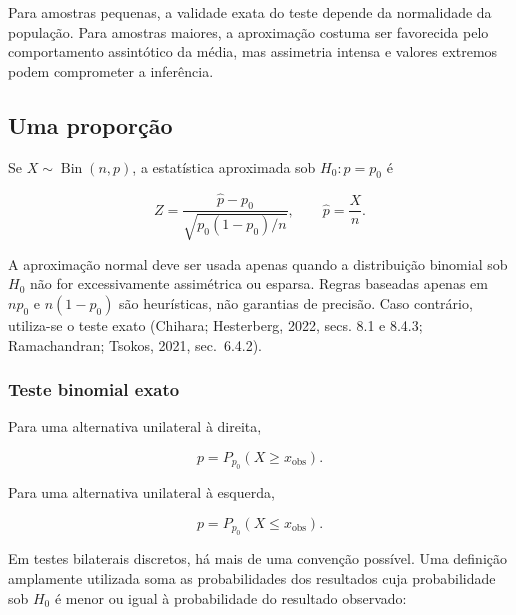 \documentclass[
  letterpaper,
  DIV=11,
  numbers=noendperiod]{scrreprt}
\begin{document}
\begin{tcolorbox}[enhanced jigsaw, colback=white, leftrule=.75mm, colbacktitle=quarto-callout-warning-color!10!white, breakable, titlerule=0mm, bottomtitle=1mm, title=\textcolor{quarto-callout-warning-color}{\faExclamationTriangle}\hspace{0.5em}{Pressuposto}, colframe=quarto-callout-warning-color-frame, toprule=.15mm, opacityback=0, bottomrule=.15mm, opacitybacktitle=0.6, arc=.35mm, toptitle=1mm, rightrule=.15mm, coltitle=black, left=2mm]

Para amostras pequenas, a validade exata do teste depende da normalidade
da população. Para amostras maiores, a aproximação costuma ser
favorecida pelo comportamento assintótico da média, mas assimetria
intensa e valores extremos podem comprometer a inferência.

\end{tcolorbox}

\subsection{Uma proporção}\label{uma-proporuxe7uxe3o}

Se \(X\sim\operatorname{Bin}(n,p)\), a estatística aproximada sob
\(H_0:p=p_0\) é

\[Z
=
\frac{\widehat p-p_0}
{\sqrt{p_0(1-p_0)/n}},
\qquad
\widehat p=\frac{X}{n}.\]

A aproximação normal deve ser usada apenas quando a distribuição
binomial sob \(H_0\) não for excessivamente assimétrica ou esparsa.
Regras baseadas apenas em \(np_0\) e \(n(1-p_0)\) são heurísticas, não
garantias de precisão. Caso contrário, utiliza-se o teste exato
(Chihara; Hesterberg, 2022, secs. 8.1 e 8.4.3; Ramachandran; Tsokos,
2021, sec.~6.4.2).

\subsubsection{Teste binomial exato}\label{teste-binomial-exato}

Para uma alternativa unilateral à direita,

\[p=P_{p_0}(X\geq x_{\mathrm{obs}}).\]

Para uma alternativa unilateral à esquerda,

\[p=P_{p_0}(X\leq x_{\mathrm{obs}}).\]

Em testes bilaterais discretos, há mais de uma convenção possível. Uma
definição amplamente utilizada soma as probabilidades dos resultados
cuja probabilidade sob \(H_0\) é menor ou igual à probabilidade do
resultado observado:
\end{document}
